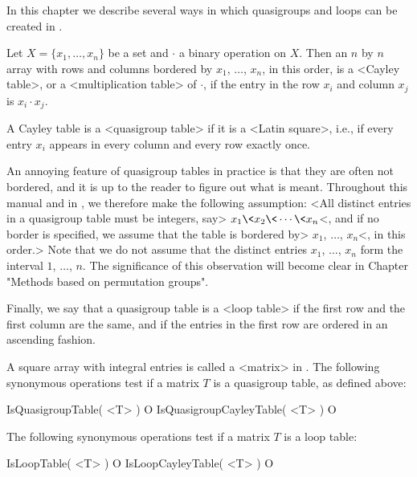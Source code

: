 
In this chapter we describe several ways in which quasigroups and loops can be created in {\LOOPS}.


Let $X=\{x_1,\dots,x_n\}$ be a set and $\cdot$ a binary operation on $X$. Then
an $n$ by $n$ array with rows and columns bordered by $x_1$, $\dots$, $x_n$, in
this order, is a <Cayley table>, or a
<multiplication table>
of $\cdot$, if the entry in the row $x_i$ and column $x_j$ is $x_i\cdot x_j$.

A Cayley table is a <quasigroup
table> if it is a <Latin
square>, i.e., if every entry $x_i$ appears in every column
and every row exactly once.

An annoying feature of quasigroup tables in practice is that they are often not
bordered, and it is up to the reader to figure out what is meant. Throughout
this manual and in {\LOOPS}, we therefore make the following assumption: <All
distinct entries in a quasigroup table must be integers, say>
$x_1\<x_2\<\cdots\<x_n$<, and if no border is specified, we assume that the
table is bordered by> $x_1$, $\dots$, $x_n$<, in this order.> Note that we do
not assume that the distinct entries $x_1$, $\dots$, $x_n$ form the interval
$1$, $\dots$, $n$. The significance of this observation will become clear in
Chapter "Methods based on permutation groups".

Finally, we say that a quasigroup table is a <loop
table> if the first row and the first
column are the same, and if the entries in the first row are ordered in an
ascending fashion.


A square array with integral entries is called a <matrix> in {\GAP}. The
following synonymous operations test if a matrix $T$ is a quasigroup table, as
defined above:

\>IsQuasigroupTable( <T> ) O
\>IsQuasigroupCayleyTable( <T> ) O

The following synonymous operations test if a matrix $T$ is a loop table:

\>IsLoopTable( <T> ) O
\>IsLoopCayleyTable( <T> ) O

